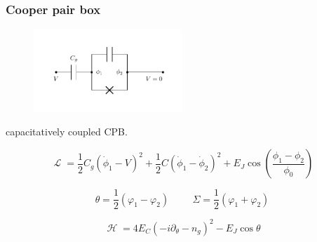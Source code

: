 \documentclass[10pt]{beamer}
\DeclareMathOperator{\lagr}{\mathcal{L}}
\DeclareMathOperator{\ham}{\mathcal{H}}
\begin{document}
\begin{frame}[shrink=20]
\frametitle{Cooper pair box}

\begin{figure}
	\centering
	\includegraphics[trim={0cm 1cm 0cm 1cm}, clip, width=0.5\textwidth]{cpb.pdf}
\end{figure}
capacitatively coupled CPB.

\begin{equation}
\lagr 
= \frac{1}{2} C_g (\dot{\phi}_1 - V)^2 + \frac{1}{2} C (\dot{\phi}_1 - \dot{\phi}_2)^2 + E_J \cos{\left(\frac{\phi_1 - \phi_2}{\phi_0}\right)} 
\end{equation}

\begin{equation}
\theta = \frac{1}{2} (\varphi_1 - \varphi_2)
\hspace{1cm}
\Sigma = \frac{1}{2} (\varphi_1 + \varphi_2)
\end{equation}

\begin{equation}
\boxed{ \ham = 4 E_C (- i \partial_\theta - n_g)^2 - E_J \cos{\theta} }
\end{equation}

\end{frame}


\end{document}
